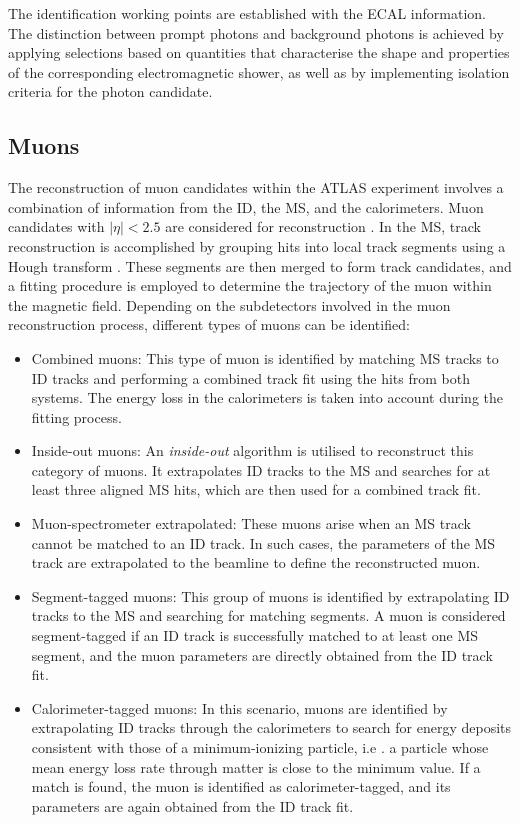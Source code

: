 The identification working points are established with the ECAL information.
The distinction between prompt photons and background photons is achieved 
by applying selections based on quantities that characterise the shape and 
properties of the corresponding electromagnetic shower, as well as by 
implementing isolation criteria for the photon candidate.

\subsection{Muons}
\label{sec:Chap3:Reco:Mu}
The reconstruction of muon candidates within the ATLAS experiment involves a combination of 
information from the ID, the MS, and the calorimeters. Muon candidates with $|\eta|<2.5$ are 
considered for reconstruction \cite{ATLAS:2020auj}.  In the MS, track reconstruction is accomplished 
by grouping hits into local track segments using a Hough transform \cite{ILLINGWORTH198887}.
These segments are then merged to form track candidates, and a fitting procedure is employed to 
determine the trajectory of the muon within the magnetic field. Depending on the subdetectors 
involved in the muon reconstruction process, different types of muons can be identified:
\begin{itemize}
	\item Combined muons: This type of muon is identified by matching MS tracks to ID 
	tracks and performing a combined track fit using the hits from both systems. The energy
	loss in the calorimeters is taken into account during the fitting process.

	\item Inside-out muons: An \textit{inside-out} algorithm is utilised to reconstruct this category
	of muons. It extrapolates ID tracks to the MS and searches for at least three aligned MS 
	hits, which are then used for a combined track fit.

	\item Muon-spectrometer extrapolated: These muons arise when an MS track cannot be
	matched to an ID track. In such cases, the parameters of the MS track are extrapolated to 
	the beamline to define the reconstructed muon.

	\item Segment-tagged muons: This group of muons is identified by extrapolating ID tracks 
	to the MS and searching for matching segments. A muon is considered segment-tagged if 
	an ID track is successfully matched to at least one MS segment, and the muon parameters 
	are directly obtained from the ID track fit.

	\item Calorimeter-tagged muons: In this scenario, muons are identified by extrapolating ID 
	tracks through the calorimeters to search for energy deposits consistent with those of a 
	minimum-ionizing particle, i.e . a particle whose mean energy loss rate through matter is 
	close to the minimum value. If a match is found, the muon is identified as 
	calorimeter-tagged, and its parameters are again obtained from the ID track fit.	
\end{itemize}

